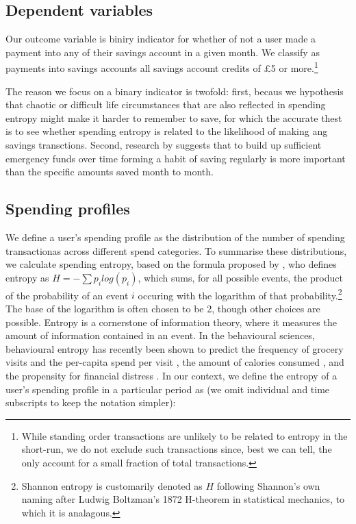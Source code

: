 \subsection{Dependent variables}
\label{sub:dependent_variables}

Our outcome variable is biniry indicator for whether of not a user made a
payment into any of their savings account in a given month. We classify as
payments into savings accounts all savings account credits of \pounds5 or
more.\footnote{While standing order transactions are unlikely to be related to
entropy in the short-run, we do not exclude such transactions since, best we
can tell, the only account for a small fraction of total transactions.}

The reason we focus on a binary indicator is twofold: first, becaus we
hypothesis that chaotic or difficult life circumstances that are also reflected
in spending entropy might make it harder to remember to save, for which the
accurate thest is to see whether spending entropy is related to the likelihood
of making ang savings transctions. Second, research by \citet{mps2018building}
suggests that to build up sufficient emergency funds over time forming a habit
of saving regularly is more important than the specific amounts saved month to
month.

\subsection{Spending profiles}%
\label{sub:spending_profiles}

We define a user's spending profile as the distribution of the number of
spending transactionas across different spend categories. To summarise these
distributions, we calculate spending entropy, based on the formula proposed by
\citet{shannon1948mathematical}, who defines entropy as $H =
-\sum{p_i}log(p_i)$, which sums, for all possible events, the product of the
probability of an event $i$ occuring with the logarithm of that
probability.\footnote{Shannon entropy is customarily denoted as $H$ following
Shannon's own naming after Ludwig Boltzman's 1872 H-theorem in statistical
mechanics, to which it is analagous.} The base of the logarithm is often chosen
to be 2, though other choices are possible. Entropy is a cornerstone of
information theory, where it measures the amount of information contained in an
event. In the behavioural sciences, behavioural entropy has recently been shown
to predict the frequency of grocery visits and the per-capita spend per visit
\citep{guidotti2015behavioral}, the amount of calories consumed
\citep{skatova2019those}, and the propensity for financial distress
\citep{muggleton2020evidence}. In our context, we define the entropy of a
user's spending profile in a particular period as (we omit individual and time
subscripts to keep the notation simpler):

